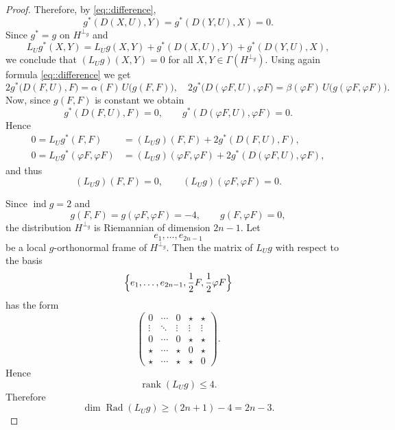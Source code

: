 \documentclass[12pt,a4paper,final]{amsart}
\numberwithin{equation}{section}
\theoremstyle{df}
\newcommand{\ind}{\operatorname{ind}}
\newcommand{\Rad}{\operatorname{Rad}}
\begin{document}
\begin{proof}
Therefore, by \eqref{eq::difference},
$$
g^\ast(D(X,U),Y)=g^\ast(D(Y,U),X)=0.
$$
Since $g^\ast=g$ on $H^{\perp_g}$ and
$$
L_Ug^\ast(X,Y)=L_Ug(X,Y)+g^\ast(D(X,U),Y)+g^\ast(D(Y,U),X),
$$
we conclude that $(L_Ug)(X,Y)=0$ for all $X,Y\in\Gamma(H^{\perp_g})$.
Using again formula \eqref{eq::difference} we get
$$
2g^\ast\bigl(D(F,U),F\bigr)=\alpha(F)\,U\bigl(g(F,F)\bigr),
\quad
2g^\ast\bigl(D(\varphi F,U),\varphi F\bigr)
=\beta(\varphi F)\,U\bigl(g(\varphi F,\varphi F)\bigr).
$$
Now, since $g(F,F)$ is constant we obtain
$$
g^\ast(D(F,U),F)=0,
\qquad
g^\ast(D(\varphi F,U),\varphi F)=0.
$$
Hence
\begin{align*}
0=L_Ug^\ast(F,F)&=(L_Ug)(F,F)+2g^\ast(D(F,U),F),\\
0=L_Ug^\ast(\varphi F,\varphi F)&=(L_Ug)(\varphi F,\varphi F)
+2g^\ast(D(\varphi F,U),\varphi F),
\end{align*}
and thus
$$
(L_Ug)(F,F)=0,
\qquad
(L_Ug)(\varphi F,\varphi F)=0.
$$

Since $\ind g=2$ and
$$
g(F,F)=g(\varphi F,\varphi F)=-4,
\qquad
g(F,\varphi F)=0,
$$
the distribution $H^{\perp_g}$ is Riemannian of dimension $2n-1$. Let
$$
e_1,\dots,e_{2n-1}
$$
be a local $g$-orthonormal frame of $H^{\perp_g}$. Then the matrix of $L_Ug$
with respect to the basis
$$
\Bigl\{e_1,\dots,e_{2n-1},\frac12F,\frac12\varphi F\Bigr\}
$$
has the form
$$
\begin{pmatrix}
0 & \cdots & 0 & \star & \star\\
\vdots & \ddots & \vdots & \vdots & \vdots\\
0 & \cdots & 0 & \star & \star\\
\star & \cdots & \star & 0 & \star\\
\star & \cdots & \star & \star & 0
\end{pmatrix}.
$$
Hence
$$
\operatorname{rank}(L_Ug)\le 4.
$$
Therefore
$$
\dim\Rad(L_Ug)\ge (2n+1)-4=2n-3.
$$
\end{proof}
\end{document}
